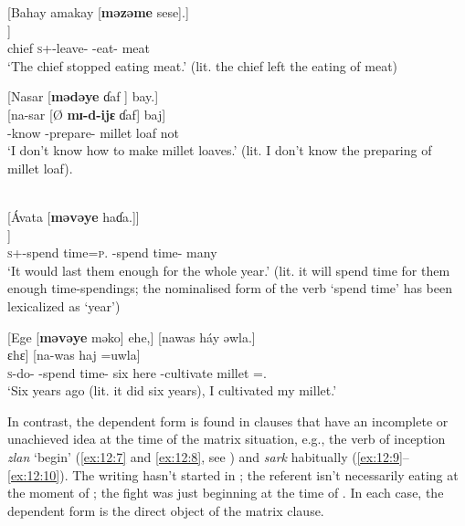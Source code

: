 \ea \label{ex:12:3}
[Bahay  amakay  [\textbf{məzəme}  sese].]\\
\gll  [bahaj   à-mak-aj   [Ø \textbf{mɪ-ʒʊm-ɛ}  ʃɛʃɛ]]\\
      chief  \textsc{s}+{\PFV}-leave-{\CL}  { }  {\NOM}-eat-{\CL}  meat\\
\glt  ‘The chief stopped eating meat.’ (lit. the chief left the eating of meat) 
\z 

\ea \label{ex:12:4}
[Nasar  [\textbf{mədəye}  ɗaf ]  bay.]\\
\gll  {}[na-sar   [Ø \textbf{mɪ-d-ijɛ}      ɗaf]  baj]\\
      {\oneS}-know  { }  {\NOM}{}-prepare-{\CL}  {millet loaf}  not\\
\glt  ‘I don’t know how to make millet loaves.’ (lit. I don’t know the preparing of millet loaf).
\z 

\clearpage
\ea \label{ex:12:5}
\\
{}[Ávata  [\textbf{məvəye}  haɗa.]]\\
\gll  [á-v=ata     [\textbf{mɪ-v-ijɛ}    haɗa]]\\
      \textsc{s}+{\IFV}-{spend time}=\textsc{p}.{\IO}  {\NOM}{}-{spend time}-{\CL}  many\\
\glt  ‘It would last them enough for the whole year.’  (lit. it will {spend time} for them enough time-spendings; the nominalised form of the verb ‘{spend time}’ has been lexicalized as ‘year’)
\z 

\ea \label{ex:12:6}
[Ege  [\textbf{məvəye} məko]  ehe,]  [nawas  háy  əwla.]\\
\gll  [ɛ-g-ɛ  [\textbf{mɪ-v-ijɛ}  mʊkʷɔ]  ɛhɛ]  [na-was    haj  =uwla]\\
      \textsc{s}-do-{\CL}  {\NOM}{}-{spend time}-{\CL}  six  here {\oneS}-cultivate  millet  ={\oneS}.{\POSS}\\
\glt  ‘Six years ago (lit. it did six years), I cultivated my millet.’ 
\z 

In contrast, the dependent form is found in clauses that have an incomplete or unachieved idea at the time of the matrix situation, e.g., the verb of inception \textit{zlan} ‘begin’ (\ref{ex:12:7} and \ref{ex:12:8}, see ) and \textit{sark} habitually (\ref{ex:12:9}--\ref{ex:12:10}). The writing hasn’t started in ; the referent isn’t necessarily eating at the moment of ; the fight was just beginning at the time of . In each case, the dependent form is the direct object of the matrix clause.

